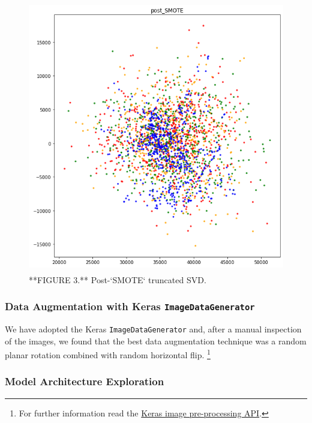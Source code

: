 \documentclass[]{article}
\begin{document}
\begin{figure}

{\centering \includegraphics[width=450px,height=450]{Images/TruncatedSVD_postSMOTE} 

}

\caption{**FIGURE 3.** Post-`SMOTE` truncated SVD.}\label{fig:post-smote}
\end{figure}

\hypertarget{data-generator}{%
\subsubsection{\texorpdfstring{Data Augmentation with Keras
\texttt{ImageDataGenerator}}{Data Augmentation with Keras ImageDataGenerator}}\label{data-generator}}

We have adopted the Keras \texttt{ImageDataGenerator} and, after a
manual inspection of the images, we found that the best data
augmentation technique was a random planar rotation combined with random
horizontal flip. \footnote{For further information read the
  \href{https://keras.io/api/preprocessing/image/}{Keras image
  pre-processing API}.}

\hypertarget{exploration}{%
\subsubsection{Model Architecture Exploration}\label{exploration}}
\end{document}
